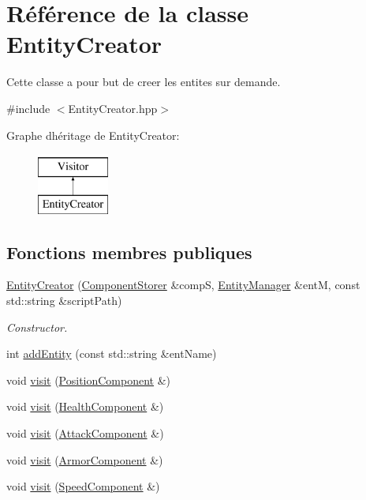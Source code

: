 \hypertarget{classEntityCreator}{}\section{Référence de la classe Entity\+Creator}
\label{classEntityCreator}


Cette classe a pour but de creer les entites sur demande.  




{\ttfamily \#include $<$Entity\+Creator.\+hpp$>$}

Graphe d\textquotesingle{}héritage de Entity\+Creator\+:\begin{figure}[H]
\begin{center}
\leavevmode
\includegraphics[height=2.000000cm]{classEntityCreator}
\end{center}
\end{figure}
\subsection*{Fonctions membres publiques}
\begin{DoxyCompactItemize}
\item 
\hyperlink{classEntityCreator_acf61fa9cbe29e50bff8a60620e01a3f2}{Entity\+Creator} (\hyperlink{classComponentStorer}{Component\+Storer} \&compS, \hyperlink{classEntityManager}{Entity\+Manager} \&entM, const std\+::string \&script\+Path)
\begin{DoxyCompactList}\small\item\em Constructor. \end{DoxyCompactList}\item 
int \hyperlink{classEntityCreator_a55f031e5e1ea0afc99375bcb0c2ace94}{add\+Entity} (const std\+::string \&ent\+Name)
\item 
void \hyperlink{classEntityCreator_ae6e6fa03f354303f33714c875bda0c62}{visit} (\hyperlink{structPositionComponent}{Position\+Component} \&)
\item 
void \hyperlink{classEntityCreator_aaa96ee2442660da23e34a1f0cec3fa47}{visit} (\hyperlink{structHealthComponent}{Health\+Component} \&)
\item 
void \hyperlink{classEntityCreator_a48a6a070dee113ccf56916c0077845c1}{visit} (\hyperlink{structAttackComponent}{Attack\+Component} \&)
\item 
void \hyperlink{classEntityCreator_af23e7656c8ee20319bd890aad99a6996}{visit} (\hyperlink{structArmorComponent}{Armor\+Component} \&)
\item 
void \hyperlink{classEntityCreator_aee1042f0ec1dc1310ab4c0096d09e094}{visit} (\hyperlink{structSpeedComponent}{Speed\+Component} \&)
\end{DoxyCompactItemize}


